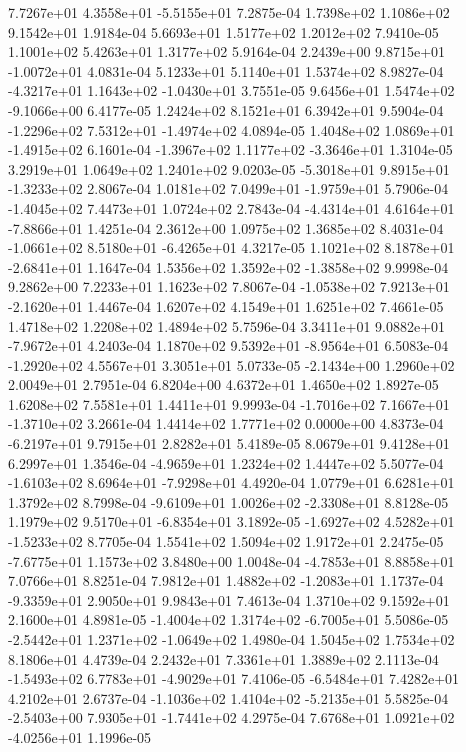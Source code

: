  7.7267e+01  4.3558e+01 -5.5155e+01  7.2875e-04
1.7398e+02 1.1086e+02 9.1542e+01  1.9184e-04
5.6693e+01 1.5177e+02 1.2012e+02  7.9410e-05
1.1001e+02 5.4263e+01 1.3177e+02  5.9164e-04
 2.2439e+00  9.8715e+01 -1.0072e+01  4.0831e-04
5.1233e+01 5.1140e+01 1.5374e+02  8.9827e-04
-4.3217e+01  1.1643e+02 -1.0430e+01  3.7551e-05
 9.6456e+01  1.5474e+02 -9.1066e+00  6.4177e-05
1.2424e+02 8.1521e+01 6.3942e+01  9.5904e-04
-1.2296e+02  7.5312e+01 -1.4974e+02  4.0894e-05
 1.4048e+02  1.0869e+01 -1.4915e+02  6.1601e-04
-1.3967e+02  1.1177e+02 -3.3646e+01  1.3104e-05
3.2919e+01 1.0649e+02 1.2401e+02  9.0203e-05
-5.3018e+01  9.8915e+01 -1.3233e+02  2.8067e-04
 1.0181e+02  7.0499e+01 -1.9759e+01  5.7906e-04
-1.4045e+02  7.4473e+01  1.0724e+02  2.7843e-04
-4.4314e+01  4.6164e+01 -7.8866e+01  1.4251e-04
2.3612e+00 1.0975e+02 1.3685e+02  8.4031e-04
-1.0661e+02  8.5180e+01 -6.4265e+01  4.3217e-05
 1.1021e+02  8.1878e+01 -2.6841e+01  1.1647e-04
 1.5356e+02  1.3592e+02 -1.3858e+02  9.9998e-04
9.2862e+00 7.2233e+01 1.1623e+02  7.8067e-04
-1.0538e+02  7.9213e+01 -2.1620e+01  1.4467e-04
1.6207e+02 4.1549e+01 1.6251e+02  7.4661e-05
1.4718e+02 1.2208e+02 1.4894e+02  5.7596e-04
 3.3411e+01  9.0882e+01 -7.9672e+01  4.2403e-04
 1.1870e+02  9.5392e+01 -8.9564e+01  6.5083e-04
-1.2920e+02  4.5567e+01  3.3051e+01  5.0733e-05
-2.1434e+00  1.2960e+02  2.0049e+01  2.7951e-04
6.8204e+00 4.6372e+01 1.4650e+02  1.8927e-05
1.6208e+02 7.5581e+01 1.4411e+01  9.9993e-04
-1.7016e+02  7.1667e+01 -1.3710e+02  3.2661e-04
1.4414e+02 1.7771e+02 0.0000e+00  4.8373e-04
-6.2197e+01  9.7915e+01  2.8282e+01  5.4189e-05
8.0679e+01 9.4128e+01 6.2997e+01  1.3546e-04
-4.9659e+01  1.2324e+02  1.4447e+02  5.5077e-04
-1.6103e+02  8.6964e+01 -7.9298e+01  4.4920e-04
1.0779e+01 6.6281e+01 1.3792e+02  8.7998e-04
-9.6109e+01  1.0026e+02 -2.3308e+01  8.8128e-05
 1.1979e+02  9.5170e+01 -6.8354e+01  3.1892e-05
-1.6927e+02  4.5282e+01 -1.5233e+02  8.7705e-04
1.5541e+02 1.5094e+02 1.9172e+01  2.2475e-05
-7.6775e+01  1.1573e+02  3.8480e+00  1.0048e-04
-4.7853e+01  8.8858e+01  7.0766e+01  8.8251e-04
 7.9812e+01  1.4882e+02 -1.2083e+01  1.1737e-04
-9.3359e+01  2.9050e+01  9.9843e+01  7.4613e-04
1.3710e+02 9.1592e+01 2.1600e+01  4.8981e-05
-1.4004e+02  1.3174e+02 -6.7005e+01  5.5086e-05
-2.5442e+01  1.2371e+02 -1.0649e+02  1.4980e-04
1.5045e+02 1.7534e+02 8.1806e+01  4.4739e-04
2.2432e+01 7.3361e+01 1.3889e+02  2.1113e-04
-1.5493e+02  6.7783e+01 -4.9029e+01  7.4106e-05
-6.5484e+01  7.4282e+01  4.2102e+01  2.6737e-04
-1.1036e+02  1.4104e+02 -5.2135e+01  5.5825e-04
-2.5403e+00  7.9305e+01 -1.7441e+02  4.2975e-04
 7.6768e+01  1.0921e+02 -4.0256e+01  1.1996e-05
